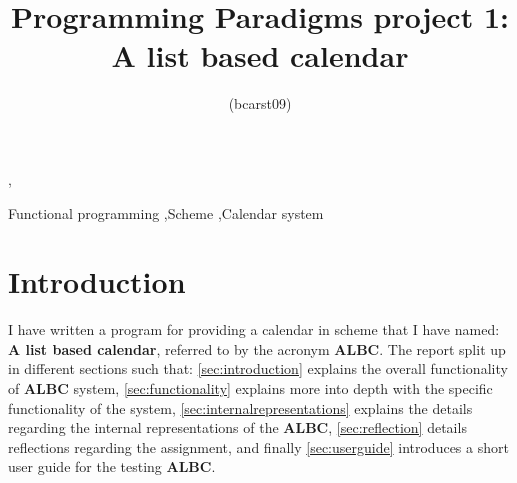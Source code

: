 \documentclass{IOS-Book-Article}
\begin{document}

\newpage

\pagestyle{plain}
\setcounter{page}{1}

\begin{frontmatter}    

\title{Programming Paradigms project 1: \\ A list based calendar}

\author{  (bcarst09)}, %

\address{Department of Computer Science, Aalborg University, Denmark}





\begin{keyword}
Functional programming \sep Scheme \sep Calendar system
\end{keyword}
\end{frontmatter}



\section{Introduction} \label{sec:introduction}
I have written a program for providing a calendar in scheme that I have named: \\ 
\textbf{A list based calendar}, referred to by the acronym \textbf{ALBC}. 
The report split up in different sections such that: \autoref{sec:introduction} explains the overall functionality of \textbf{ALBC} system, \autoref{sec:functionality} explains more into depth with the specific functionality of the system, \autoref{sec:internalrepresentations} explains the details regarding the internal representations of the \textbf{ALBC}, \autoref{sec:reflection} details reflections regarding the assignment, and finally \autoref{sec:userguide} introduces a short user guide for the testing \textbf{ALBC}. 
\end{document}

